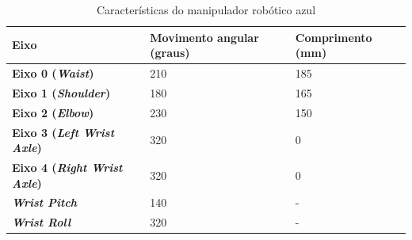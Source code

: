 \begin{table}
    \centering
    \caption{Características do manipulador robótico azul}
    \label{tab:caracteristicasManipuladorAzul}
    \begin{tabular}{|l|l|l|}
        \hline
        \textbf{Eixo} & \textbf{Movimento angular (graus)} & \textbf{Comprimento (mm)} \\ \hline
        \textbf{Eixo 0 (\textit{Waist})}            & 210 & 185 \\ \hline
        \textbf{Eixo 1 (\textit{Shoulder})}         & 180 & 165 \\ \hline
        \textbf{Eixo 2 (\textit{Elbow})}            & 230 & 150 \\ \hline
        \textbf{Eixo 3 (\textit{Left Wrist Axle})}  & 320 & 0 \\ \hline
        \textbf{Eixo 4 (\textit{Right Wrist Axle})} & 320 & 0 \\ \hline
        \textbf{\textit{Wrist Pitch}}               & 140 & - \\ \hline
        \textbf{\textit{Wrist Roll}}                & 320 & - \\ \hline
    \end{tabular}
\end{table}

